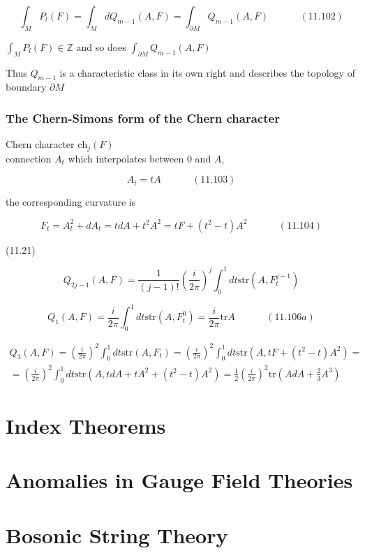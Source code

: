 \documentclass{book}
\begin{document}
\begin{equation}
  \int_M P_l(F) = \int_M dQ_{m-1}{ (A, F)} = \int_{\partial M} Q_{m-1}{ (A, F) } \quad \quad \quad \, (11.102)
\end{equation}

$\int_M P_l(F) \in \mathbb{Z}$ and so does $\int_{ \partial M } Q_{m-1}{ (A, F) }$

Thus $Q_{m-1}$ is a characteristic class in its own right and describes the topology of boundary $\partial M$





\subsection{ The Chern-Simons form of the Chern character}

Chern character $\text{ch}_j{(F)}$ \\
\quad connection $A_t$ which interpolates between $0$ and $A$, 

\begin{equation}
  A_t = tA \quad \quad \quad \, (11.103)
\end{equation}

the corresponding curvature is 

\begin{equation}
  F_t = A_t^2 + dA_t = t dA + t^2 A^2 = tF + (t^2- t)A^2 \quad \quad \quad \, (11.104)
\end{equation}

(11.21)

\begin{equation}
  Q_{2j-1}(A, F) = \frac{1}{ (j-1)!} \left( \frac{i}{ 2\pi } \right)^j \int_0^1 dt \text{str}{ (A, F^{j-1}_t )}
\end{equation}

\begin{equation}
  Q_1(A,F) = \frac{i}{2\pi} \int_0^1 dt \text{str}{ (A, F_t^0) } = \frac{i}{2\pi} \text{tr}{A} \quad \quad \quad \, (11.106a)
\end{equation}

\begin{equation}
  \begin{gathered} 
    Q_3(A,F) = \left( \frac{i}{2\pi} \right)^2 \int_0^1 dt \text{str}{ (A, F_t) } = \left( \frac{i}{2\pi} \right)^2 \int_0^1 dt \text{str}{ (A, tF + (t^2 - t) A^2) } = \\
    = \left( \frac{i}{2\pi} \right)^2 \int_0^1 dt \text{str}{ (A, t dA + tA^2 + (t^2 - t) A^2 )}    = \frac{1}{2} \left( \frac{i}{2\pi  } \right)^2 \text{tr}{ ( A dA + \frac{2}{3} A^3 ) }
\end{gathered}
\end{equation}






\chapter{Index Theorems}




\chapter{Anomalies in Gauge Field Theories}




\chapter{Bosonic String Theory}
\end{document}
